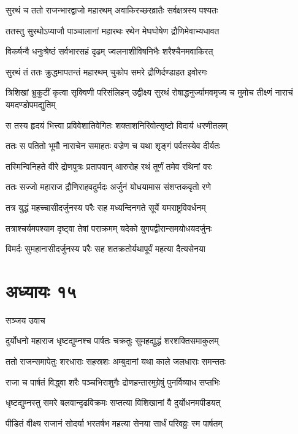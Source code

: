 \twolineshloka
{सुरथं च ततो राजन्भारद्वाजो महारथम्}
{अवाकिरच्छरव्रातैः सर्वक्षत्रस्य पश्यतः}


\twolineshloka
{ततस्तु सुरथोऽप्याजौ पाञ्चालानां महारथः}
{रथेन मेघघोषेण द्रौणिमेवाभ्यधावत}


\twolineshloka
{विकर्षन्वै धनुःश्रेष्ठं सर्वभारसहं दृढम्}
{ज्वलनाशीविषनिभैः शरैश्चैनमवाकिरत्}


\twolineshloka
{सुरथं तं ततः क्रुद्धमापतन्तं महारथम्}
{चुकोप समरे द्रौणिर्दण्डाहत इवोरगः}


\threelineshloka
{त्रिशिखां भ्रुकुटीं कृत्वा सृक्विणी परिसंलिहन्}
{उद्वीक्ष्य सुरथं रोषाद्धनुर्ज्यामवमृज्य च}
{मुमोच तीक्ष्णं नाराचं यमदण्डोपमद्युतिम्}


\twolineshloka
{स तस्य हृदयं भित्त्वा प्रविवेशातिवेगितः}
{शक्ताशनिरिवोत्सृष्टो विदार्य धरणीतलम्}


\twolineshloka
{ततः स पतितो भूमौ नाराचेन समाहतः}
{वज्रेण च यथा शृङ्गं पर्वतस्येव दीर्यतः}


\twolineshloka
{तस्मिन्विनिहते वीरे द्रोणपुत्रः प्रतापवान्}
{आरुरोह रथं तूर्णं तमेव रथिनां वरः}


\twolineshloka
{ततः सज्जो महाराज द्रौणिराहवदुर्मदः}
{अर्जुनं योधयामास संशप्तकवृतो रणे}


\twolineshloka
{तत्र युद्धं महच्चासीदर्जुनस्य परैः सह}
{मध्यन्दिनगते सूर्ये यमराष्ट्रविवर्धनम्}


\twolineshloka
{तत्राश्चर्यमपश्याम दृष्ट्वा तेषां पराक्रमम्}
{यदेको युगपद्वीरान्समयोधयदर्जुनः}


\twolineshloka
{विमर्दः सुमहानासीदर्जुनस्य परैः सह}
{शतक्रतोर्यथापूर्वं महत्या दैत्यसेनया}


\chapter{अध्यायः १५}
\twolineshloka
{सञ्जय उवाच}
{}


\twolineshloka
{दुर्योधनो महाराज धृष्टद्युम्नश्च पार्षतः}
{चक्रतुः सुमहद्युद्धं शरशक्तिसमाकुलम्}


\twolineshloka
{ततो राजन्समापेतुः शरधाराः सहस्रशः}
{अम्बुदानां यथा काले जलधाराः समन्ततः}


\twolineshloka
{राजा च पार्षतं विद्ध्वा शरैः पञ्चभिराशुगैः}
{द्रोणहन्तारमुग्रेषुं पुनर्विव्याध सप्तभिः}


\twolineshloka
{धृष्टद्युम्नस्तु समरे बलवान्दृढविक्रमः}
{सप्तत्या विशिखानां वै दुर्योधनमपीडयत्}


\twolineshloka
{पीडितं वीक्ष्य राजानं सोदर्या भरतर्षभ}
{महत्या सेनया सार्धं परिवव्रुः स्म पार्षतम्}


